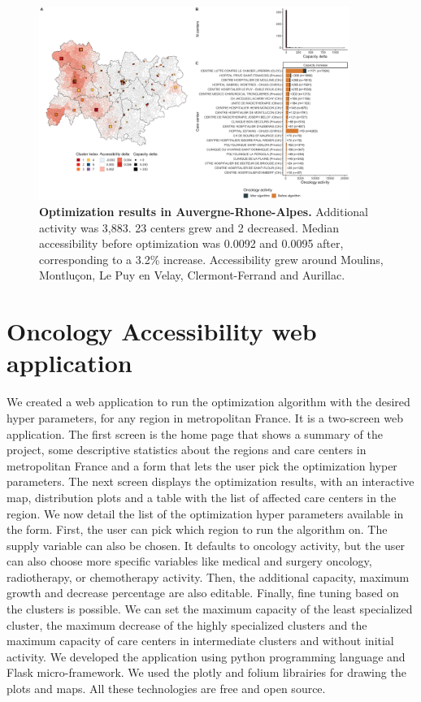 \begin{figure}[H]
    \includegraphics[width=0.9\textwidth]{images/camion/optim_region/optim_Auvergne-Rhone-Alpes.png}
    \centering
    \caption{ \textbf{Optimization results in Auvergne-Rhone-Alpes.} Additional
        activity was 3,883. 23 centers grew and 2 decreased. Median
        accessibility before optimization was 0.0092 and 0.0095 after,
        corresponding to a 3.2\% increase. Accessibility grew around Moulins,
        Montluçon, Le Puy en Velay, Clermont-Ferrand and Aurillac. }
\end{figure}

\section{Oncology Accessibility web application}


We created a web application to run the optimization algorithm with the desired
hyper parameters, for any region in metropolitan France. It is a two-screen web
application. The first screen is the home page that shows a summary of the
project, some descriptive statistics about the regions and care centers in
metropolitan France and a form that lets the user pick the optimization hyper
parameters. The next screen displays the optimization results, with an
interactive map, distribution plots and a table with the list of affected care
centers in the region. We now detail the list of the optimization hyper
parameters available in the form. First, the user can pick which region to run
the algorithm on. The supply variable can also be chosen. It defaults to
oncology activity, but the user can also choose more specific variables like
medical and surgery oncology, radiotherapy, or chemotherapy activity. Then, the
additional capacity, maximum growth and decrease percentage are also editable.
Finally, fine tuning based on the clusters is possible. We can set the maximum
capacity of the least specialized cluster, the maximum decrease of the highly
specialized clusters and the maximum capacity of care centers in intermediate
clusters and without initial activity. We developed the application using python
programming language and Flask micro-framework. We used the plotly and folium
librairies for drawing the plots and maps. All these technologies are free and
open source.

